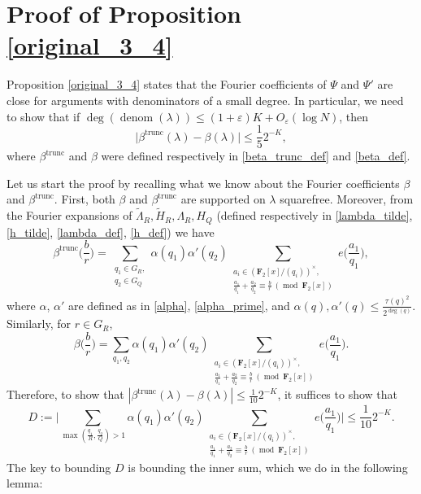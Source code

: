 \documentclass[11pt, reqno]{amsart}
\numberwithin{equation}{section}
\newcommand{\zff}{\mathbf{F}_2[x]}
\newcommand{\zffmi}[1]{(\zff/(#1))^{\times}}
\newcommand{\betatrunc}{\beta^{\trunc}}
\newcommand\eps{\varepsilon}
\newcommand\denom{\operatorname{denom}}
\newcommand\trunc{\operatorname{trunc}}
\newcommand\modd{\operatorname{mod}}
\begin{document}
\section{Proof of Proposition \ref{original_3_4}}
\label{section_3_4}
Proposition \ref{original_3_4} states that the Fourier coefficients of $\Psi$ and $\Psi'$ are close for arguments with denominators of a small degree. In particular, we need to show that if $\deg (\denom(\lambda)) \leqslant (1+\eps)K+O_{\eps}(\log N)$, then $$\Big| \betatrunc(\lambda) - \beta(\lambda) \Big| \leqslant \frac{1}{5}2^{-K},$$
where $\beta^{\trunc}$ and $\beta$ were defined respectively in \ref{beta_trunc_def} and \ref{beta_def}.

Let us start the proof by recalling what we know about the Fourier coefficients $\beta$ and $\betatrunc$.
First, both $\beta$ and $\betatrunc$ are supported on $\lambda$ squarefree. Moreover, from the Fourier expansions of $\widetilde{\Lambda}_R, \widetilde{H}_R, \Lambda_R, H_Q$ (defined respectively in \ref{lambda_tilde}, \ref{h_tilde}, \ref{lambda_def}, \ref{h_def}) we have
\begin{equation}
    \betatrunc\Big(\frac{b}{r}\Big)=\sum_{\substack{q_1 \in G_R,\\ q_2 \in G_Q}} \alpha(q_1)\alpha'(q_2) \sum_{\substack{a_i \in \zffmi{q_i},\\ \frac{a_1}{q_1}+\frac{a_2}{q_2} \equiv \frac{b}{r} \ (\modd \ \zff)}} e\Big( \frac{a_1}{q_1} \Big),
\end{equation}
where $\alpha$, $\alpha'$ are defined as in \ref{alpha}, \ref{alpha_prime}, and $\alpha(q),\alpha'(q) \leqslant \frac{\tau(q)^2}{2^{\deg( q )}}$. Similarly, for $r \in G_R$,
\begin{equation}
    \beta\Big(\frac{b}{r}\Big)=\sum_{q_1, q_2} \alpha(q_1)\alpha'(q_2) \sum_{\substack{a_i \in \zffmi{q_i},\\ \frac{a_1}{q_1}+\frac{a_2}{q_2} \equiv \frac{b}{r} \ (\modd \ \zff)}} e\Big( \frac{a_1}{q_1} \Big).
\end{equation}
Therefore, to show that $|\betatrunc(\lambda)-\beta(\lambda)| \leqslant \frac{1}{10}2^{-K}$, it suffices to show that $$D:=\bigg| \sum_{\max(\frac{q_1}{R}, \frac{q_2}{Q}) > 1} \alpha(q_1)\alpha'(q_2) \sum_{\substack{a_i \in \zffmi{q_i},\\ \frac{a_1}{q_1}+\frac{a_2}{q_2} \equiv \frac{b}{r} \ (\modd \ \zff)}} e\Big( \frac{a_1}{q_1} \Big) \bigg| \leqslant \frac{1}{10}2^{-K}.$$
The key to bounding $D$ is bounding the inner sum, which we do in the following lemma:
\end{document}
